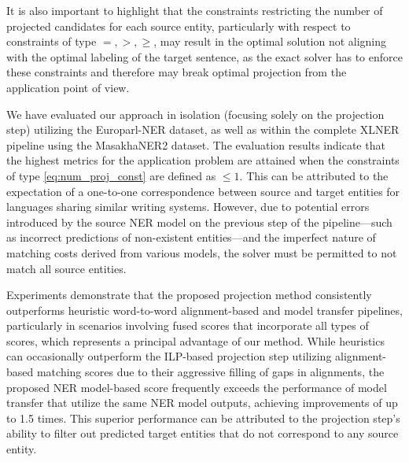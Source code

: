It is also important to highlight that the constraints restricting the number of projected candidates
for each source entity, particularly with respect to constraints of type \( =, >, \geq \), may result
in the optimal solution not aligning with the optimal labeling of the target sentence, as the
exact solver has to enforce these constraints and therefore may break optimal projection from the application
point of view.

We have evaluated our approach in isolation (focusing solely on the projection step) utilizing the
Europarl-NER dataset, as well as within the complete XLNER pipeline using the MasakhaNER2 dataset.
The evaluation results indicate that the highest metrics for the application problem are attained when
the constraints of type \eqref{eq:num_proj_const} are defined as \( \leq 1 \). This can be attributed
to the expectation of a one-to-one correspondence between source and target entities for languages
sharing similar writing systems. However, due to potential errors introduced by the source NER
model on the previous step of the pipeline—such as incorrect predictions of non-existent entities—and
the imperfect nature of matching costs derived from various models, the solver must be permitted to
not match all source entities.

Experiments demonstrate that the proposed projection method consistently outperforms
heuristic word-to-word alignment-based and model transfer pipelines, particularly in scenarios
involving fused scores that incorporate all types of scores, which represents a principal advantage
of our method. While heuristics can occasionally outperform the ILP-based projection step utilizing
alignment-based matching scores due to their aggressive filling of gaps in alignments, the proposed
NER model-based score frequently exceeds the performance of model transfer that utilize the
same NER model outputs, achieving improvements of up to 1.5 times. This superior performance can be
attributed to the projection step's ability to filter out predicted target entities that do not
correspond to any source entity.

